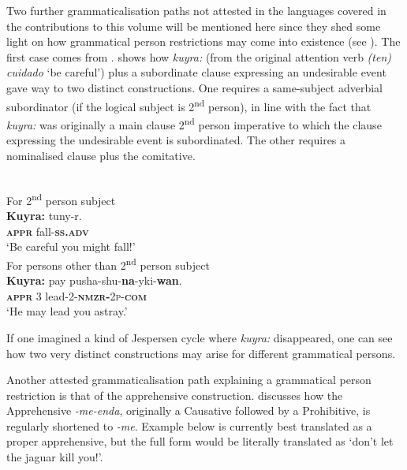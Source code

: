 \documentclass[output=paper,colorlinks,citecolor=brown]{langscibook}
\begin{document}
Two further grammaticalisation paths not attested in the languages covered in the contributions to this volume will be mentioned here since they shed some light on how grammatical person restrictions may come into existence (see ). The first case comes from . \citet[304]{weber1989} shows how \textit{kuyra:} (from the original  attention verb \textit{(ten) cuidado} `be careful') plus a subordinate clause expressing an undesirable event gave way to two distinct constructions. One  requires a same-subject adverbial subordinator (if the logical subject is 2\textsuperscript{nd} person), in line with the fact that \textit{kuyra:} was originally a main clause 2\textsuperscript{nd} person imperative to which the clause expressing the undesirable event is subordinated. The other  requires a nominalised clause plus the comitative.


\ea \label{ex:intro26} 
\\
\ea \label{ex:intro26a} \textnormal{For 2\textsuperscript{nd} person subject} \\
\gll \textbf{Kuyra:} tuny-r. \\
\textbf{\textsc{appr}} fall-\textsc{\textbf{ss.adv}} \\
\glt `Be careful you might fall!' \\
\ex \label{ex:intro26b} \textnormal{For persons other than 2\textsuperscript{nd} person subject} \\
\gll \textbf{Kuyra:} pay	pusha-shu-\textbf{na}-yki-\textbf{wan}. \\
\textbf{\textsc{appr}} 3 lead-2-\textsc{\textbf{nmzr-}2p-\textbf{com}} \\
\glt `He may lead you astray.'
\z
\z

\noindent If one imagined a kind of Jespersen cycle where \textit{kuyra:} disappeared, one can see how two very distinct constructions may arise for different grammatical persons.

Another attested grammaticalisation path explaining a grammatical person restriction is that of the  apprehensive construction. \citet[443]{fleck2003} discusses how the Apprehensive \textit{-me-enda}, originally a Causative followed by a Prohibitive, is regularly shortened to \textit{-me}. Example  below is currently best translated as a proper apprehensive, but the full form would be literally translated as `don't let the jaguar kill you!'.
\end{document}
